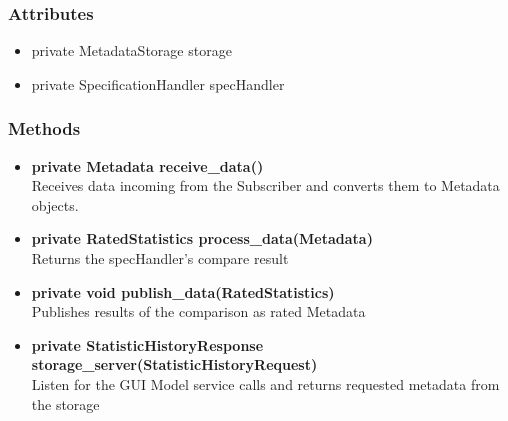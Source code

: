\subsubsection{Attributes}
\begin{itemize}
	\item private MetadataStorage storage
	\item private SpecificationHandler specHandler
\end{itemize}
\subsubsection{Methods}
\begin{itemize}
	\item \textbf{private Metadata receive\_data()}\\
	Receives data incoming from the Subscriber and converts them to Metadata objects.
	\item \textbf{private RatedStatistics process\_data(Metadata)}\\
	Returns the specHandler's compare result
	\item \textbf{private void publish\_data(RatedStatistics)}\\
	Publishes results of the comparison as rated Metadata
	\item \textbf{private StatisticHistoryResponse storage\_server(StatisticHistoryRequest)}\\
	Listen for the GUI Model service calls and returns requested metadata from the storage
\end{itemize}

\newpage

